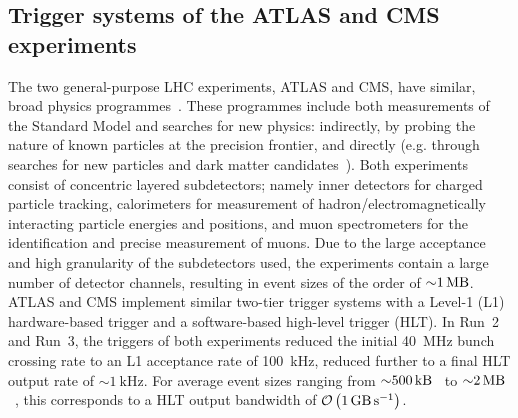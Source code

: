 \subsection{Trigger systems of the ATLAS and CMS experiments}

The two general-purpose LHC experiments, ATLAS and CMS, have similar, broad physics programmes~\cite{ATLASMachine,collaboration2008cms}. 
These programmes include both measurements of the Standard Model and searches for new physics: indirectly, by probing the nature of known particles at the precision frontier, and directly (e.g. through searches for new particles and dark matter candidates~\cite{snowmass-darkmatter}). 
Both experiments consist of concentric layered subdetectors; namely inner detectors for charged particle tracking, calorimeters for measurement of hadron/electromagnetically interacting particle energies and positions, and muon spectrometers for the identification and precise measurement of muons. 
Due to the large acceptance and high granularity of the subdetectors used, the experiments contain a large number of detector channels, resulting in event sizes of the order of  ${\sim}\SI{1}{\mega\byte}$. 
ATLAS and CMS implement similar two-tier trigger systems with a Level-1 (L1) hardware-based trigger and a software-based high-level trigger (HLT). In Run~2 and Run~3, the triggers of both experiments reduced the initial \SI{40}{\mega\hertz} bunch crossing rate to an L1 acceptance rate of \SI{100}{\kilo\hertz}, reduced further to a final HLT output rate of ${\sim}\SI{1}{\kilo\hertz}$. For average event sizes ranging from ${\sim}\SI{500}{\kilo\byte}$~\cite{ATLASRun3EventBuilder} to ${\sim}\SI{2}{\mega\byte}$~\cite{cmsRun3EventBuilder}, this corresponds to a HLT output bandwidth of $\mathcal{O}\left(\SI{1}{\giga\byte\per\second}\right)$.
